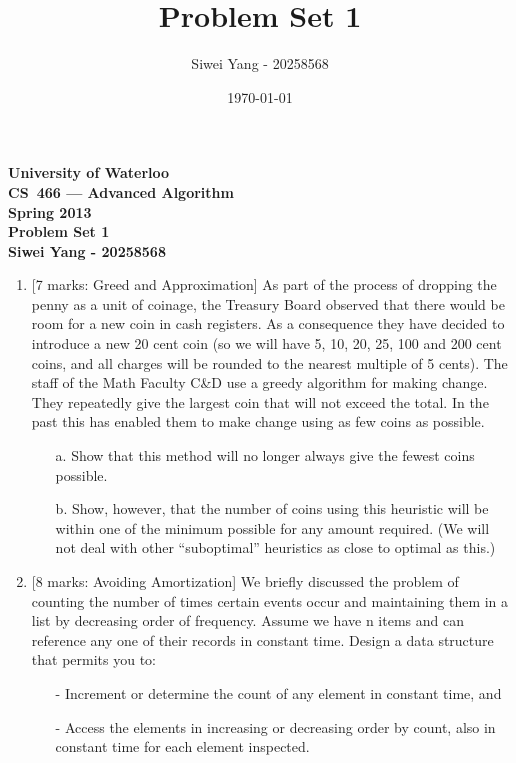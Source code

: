 \documentclass[12pt]{article}
\begin{document}
\begin{center}
\large\bf University of Waterloo\\
CS~466 --- Advanced Algorithm\\
Spring 2013\\
Problem Set 1\\
Siwei Yang - 20258568\\
\end{center}
\bigskip

\title{Problem Set 1}
\date{\today}
\author{Siwei Yang - 20258568}

\begin{enumerate}

\item{} [7 marks: Greed and Approximation]
As part of the process of dropping the penny as a unit of coinage, the Treasury Board observed that there would be room for a new coin in cash registers. As a consequence they have decided to introduce a new 20 cent coin (so we will have 5, 10, 20, 25, 100 and 200 cent coins, and all charges will be rounded to the nearest multiple of 5 cents). The staff of the Math Faculty C\&D use a greedy algorithm for making change. They repeatedly give the largest coin that will not exceed the total. In the past this has enabled them to make change using as few coins as possible.

\begin{itemize}

\item[a.] Show that this method will no longer always give the fewest coins possible.

\item[b.] Show, however, that the number of coins using this heuristic will be within one of the minimum possible for any amount required. (We will not deal with other “suboptimal” heuristics as close to optimal as this.)

\end{itemize}

\medskip

\item{} [8 marks: Avoiding Amortization]
We briefly discussed the problem of counting the number of times certain events occur and maintaining them in a list by decreasing order of frequency. Assume we have n items and can reference any one of their records in constant time. Design a data structure that permits you to:
\begin{itemize}

\item[-] Increment or determine the count of any element in constant time, and

\item[-] Access the elements in increasing or decreasing order by count, also in constant time for each element inspected.

\end{itemize}

\end{enumerate}
\end{document}
